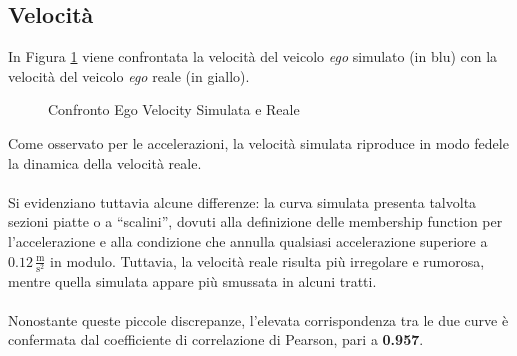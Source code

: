 \subsection{Velocità}
\noindent In Figura \ref{fig:ego_velocity_reale} viene confrontata la velocità del veicolo \emph{ego} simulato (in blu) 
con la velocità del veicolo \emph{ego} reale (in giallo). 
\begin{figure}[H]
    \centering
    \caption{Confronto Ego Velocity Simulata e Reale}
    \label{fig:ego_velocity_reale}
\end{figure}
\noindent Come osservato per le accelerazioni, la velocità simulata riproduce in modo fedele la dinamica della velocità reale.  
\\\\
\noindent Si evidenziano tuttavia alcune differenze: la curva simulata presenta talvolta sezioni piatte o a “scalini”, 
dovuti alla definizione delle membership function per l'accelerazione e alla condizione che annulla qualsiasi 
accelerazione superiore a $0.12 \,\frac{\mathrm{m}}{\mathrm{s^2}}$ in modulo.
Tuttavia, la velocità reale risulta più irregolare e rumorosa, mentre quella simulata appare più smussata in alcuni tratti.  
\\\\
\noindent Nonostante queste piccole discrepanze, l'elevata corrispondenza tra le due curve è confermata dal coefficiente di 
correlazione di Pearson, pari a \textbf{0.957}.
